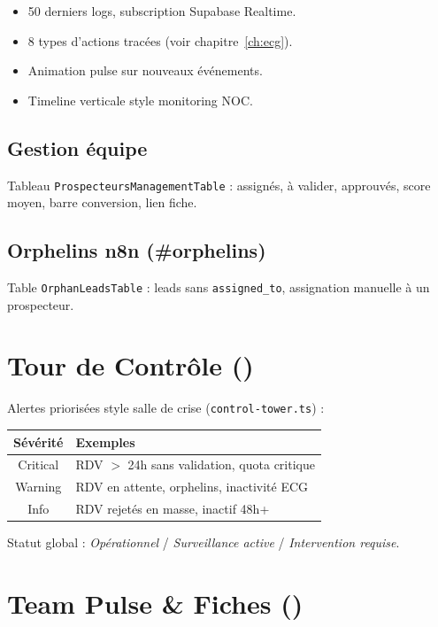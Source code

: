 \documentclass[11pt,a4paper]{report}
\begin{document}
\begin{itemize}[noitemsep]
  \item 50 derniers logs, subscription Supabase Realtime.
  \item 8 types d'actions tracées (voir chapitre~\ref{ch:ecg}).
  \item Animation pulse sur nouveaux événements.
  \item Timeline verticale style monitoring NOC.
\end{itemize}

\subsection{Gestion équipe}

Tableau \texttt{ProspecteursManagementTable} : assignés, à valider, approuvés, score moyen, barre conversion, lien fiche.

\subsection{Orphelins n8n (\#orphelins)}

Table \texttt{OrphanLeadsTable} : leads sans \texttt{assigned\_to}, assignation manuelle à un prospecteur.

\section{Tour de Contrôle ()}

Alertes priorisées style salle de crise (\texttt{control-tower.ts}) :

\begin{table}[h]
\centering
\begin{tabular}{@{}cl@{}}
\toprule
\textbf{Sévérité} & \textbf{Exemples} \\
\midrule
Critical & RDV $>$ 24h sans validation, quota critique \\
Warning & RDV en attente, orphelins, inactivité ECG \\
Info & RDV rejetés en masse, inactif 48h+ \\
\bottomrule
\end{tabular}
\end{table}

Statut global : \emph{Opérationnel} / \emph{Surveillance active} / \emph{Intervention requise}.

\section{Team Pulse \& Fiches ()}
\end{document}
